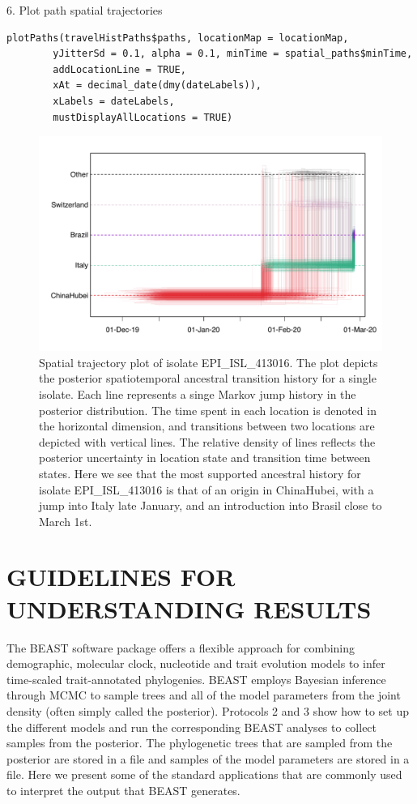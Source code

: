 \documentclass{article}
\newcommand{\code}[1]{
{\upshape\ttfamily{#1}}}
\begin{document}
6. Plot path spatial trajectories
\begin{verbatim}
plotPaths(travelHistPaths$paths, locationMap = locationMap,
        yJitterSd = 0.1, alpha = 0.1, minTime = spatial_paths$minTime,
        addLocationLine = TRUE,
        xAt = decimal_date(dmy(dateLabels)),
        xLabels = dateLabels,
        mustDisplayAllLocations = TRUE)
\end{verbatim}

\begin{figure}[!ht]
    \centering
    \includegraphics[width=1.0\textwidth]{figs/travel_trajectory.pdf}
    \caption{Spatial trajectory plot of isolate EPI\_ISL\_413016. The plot depicts the posterior spatiotemporal ancestral transition history for a single isolate. Each line represents a singe Markov jump history in the posterior distribution. The time spent in each location is denoted in the horizontal dimension, and transitions between two locations are depicted with vertical lines. The relative density of lines reflects the posterior uncertainty in location state and transition time between states. Here we see that the most supported ancestral history for isolate EPI\_ISL\_413016 is that of an origin in ChinaHubei, with a jump into Italy late January, and an introduction into Brasil close to March 1st.}
    \label{fig:trajectory}
\end{figure}

\section*{GUIDELINES FOR UNDERSTANDING RESULTS}

The BEAST software package offers a flexible approach for combining demographic, molecular clock, nucleotide and trait evolution models to infer time-scaled trait-annotated phylogenies.
BEAST employs Bayesian inference through MCMC to sample trees and all of the model parameters from the joint density (often simply called the posterior).
Protocols 2 and 3 show how to set up the different models and run the corresponding BEAST analyses to collect samples from the posterior.
The phylogenetic trees that are sampled from the posterior are stored in a\code{.trees} file and samples of the model parameters are stored in a\code{.log} file.
Here we present some of the standard applications that are commonly used to interpret the output that BEAST generates.
\end{document}
